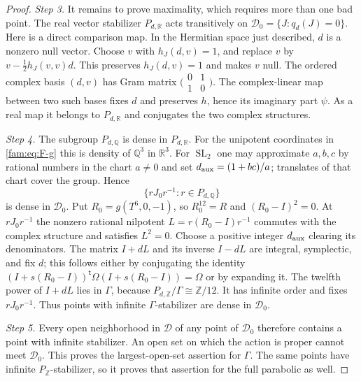 \begin{proof}
\par\noindent\textit{Step 3.} It remains to prove maximality, which requires more than one bad point.
The real vector stabilizer $P_{d,\mathbb R}$ acts transitively on
$\mathcal D_0=\{J:q_d(J)=0\}$.  Here is a direct comparison map.  In the
Hermitian space just described, $d$ is a nonzero null vector.  Choose
$v$ with $h_J(d,v)=1$, and replace $v$ by
$v-\tfrac12h_J(v,v)d$.  This preserves $h_J(d,v)=1$ and makes $v$ null.
The ordered complex basis $(d,v)$ has Gram matrix
$\bigl(\begin{smallmatrix}0&1\\1&0\end{smallmatrix}\bigr)$.
The complex-linear map between two such bases fixes $d$ and preserves
$h$, hence its imaginary part $\psi$.  As a real map it belongs to
$P_{d,\mathbb R}$ and conjugates the two complex structures.

\par\noindent\textit{Step 4.} The subgroup $P_{d,\mathbb Q}$ is dense in $P_{d,\mathbb R}$.
For the unipotent coordinates in \eqref{fam:eq:F-g} this is density of
$\mathbb Q^3$ in $\mathbb R^3$.  For $\operatorname{SL}_2$ one may
approximate $a,b,c$ by rational numbers in the chart $a\ne0$ and set
$d_{\rm aux}=(1+bc)/a$; translates of that chart cover the group.  Hence
\[
 \{rJ_0r^{-1}:r\in P_{d,\mathbb Q}\}
\]
is dense in $\mathcal D_0$.
Put $R_0=g(T^6,0,-1)$, so $R_0^{12}=R$ and
$(R_0-I)^2=0$.  At $rJ_0r^{-1}$ the nonzero rational nilpotent
$L=r(R_0-I)r^{-1}$ commutes with the complex structure and satisfies
$L^2=0$.  Choose a positive integer $d_{\rm aux}$ clearing its denominators.
The matrix $I+dL$ and its inverse $I-dL$ are integral, symplectic, and
fix $d$; this follows either by conjugating the identity
$(I+s(R_0-I))^{\mathsf t}\Omega(I+s(R_0-I))=\Omega$ or by expanding it.
The twelfth power of $I+dL$ lies in $\Gamma$, because
$P_{d,\mathbb Z}/\Gamma\cong\mathbb Z/12$.  It has infinite order and
fixes $rJ_0r^{-1}$.  Thus points with infinite $\Gamma$-stabilizer are
dense in $\mathcal D_0$.

\par\noindent\textit{Step 5.} Every open neighborhood in $\mathcal D$ of any point of $\mathcal D_0$
therefore contains a point with infinite stabilizer.  An open set on
which the action is proper cannot meet $\mathcal D_0$.  This proves the
largest-open-set assertion for $\Gamma$.  The same points have infinite
$P_{\mathbb Z}$-stabilizer, so it proves that assertion for the full
parabolic as well.
\end{proof}

